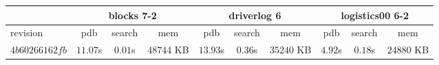 \documentclass[a4paper,12pt]{scrartcl}
\begin{document}
\begin{tabular}{|l|c|c|c|c|c|c|c|c|c|}\hline
& \multicolumn{3}{c|}{blocks 7-2} & \multicolumn{3}{c|}{driverlog 6} & \multicolumn{3}{c|}{logistics00 6-2}\\\hline
revision & pdb & search & mem & pdb & search & mem & pdb & search & mem\\\hline
$4b60266162fb$ & $11.07$s & $0.01$s & $48744$ KB & $13.93$s & $0.36$s & $35240$ KB & $4.92$s & $0.18$s & $24880$ KB\\\hline
\end{tabular}
\end{document}
